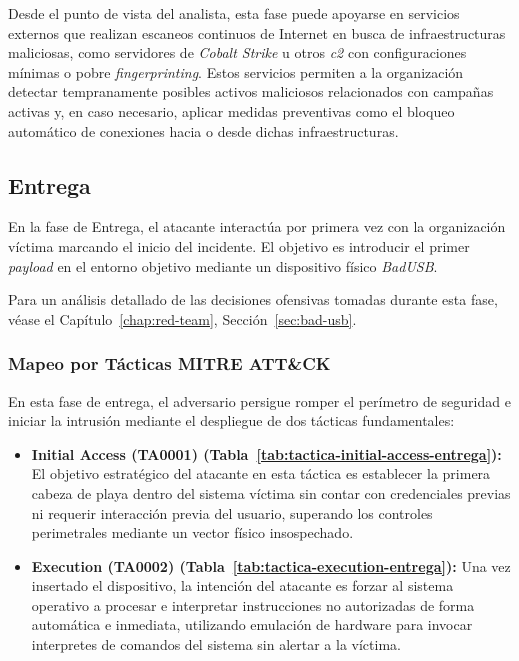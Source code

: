 Desde el punto de vista del analista, esta fase puede apoyarse en servicios externos que realizan escaneos continuos de Internet en busca de infraestructuras maliciosas, como servidores de \textit{Cobalt Strike} u otros \textit{\acrshort{c2}} con configuraciones mínimas o pobre \textit{fingerprinting}. Estos servicios permiten a la organización detectar tempranamente posibles activos maliciosos relacionados con campañas activas y, en caso necesario, aplicar medidas preventivas como el bloqueo automático de conexiones hacia o desde dichas infraestructuras.


\newpage
\subsection{Entrega} \label{sec:entrega}

En la fase de Entrega, el atacante interactúa por primera vez con la organización víctima marcando el inicio del incidente. El objetivo es introducir el primer \textit{payload} en el entorno objetivo mediante un dispositivo físico \textit{BadUSB}.

Para un análisis detallado de las decisiones ofensivas tomadas durante esta fase, véase el Capítulo~\ref{chap:red-team}, Sección~\ref{sec:bad-usb}.

\subsubsection{Mapeo por Tácticas MITRE ATT\&CK}

En esta fase de entrega, el adversario persigue romper el perímetro de seguridad e iniciar la intrusión mediante el despliegue de dos tácticas fundamentales:

\begin{itemize}
    \item \textbf{Initial Access (TA0001) (Tabla~\ref{tab:tactica-initial-access-entrega}):} El objetivo estratégico del atacante en esta táctica es establecer la primera cabeza de playa dentro del sistema víctima sin contar con credenciales previas ni requerir interacción previa del usuario, superando los controles perimetrales mediante un vector físico insospechado.
    
    \item \textbf{Execution (TA0002) (Tabla~\ref{tab:tactica-execution-entrega}):} Una vez insertado el dispositivo, la intención del atacante es forzar al sistema operativo a procesar e interpretar instrucciones no autorizadas de forma automática e inmediata, utilizando emulación de hardware para invocar interpretes de comandos del sistema sin alertar a la víctima.
\end{itemize}

